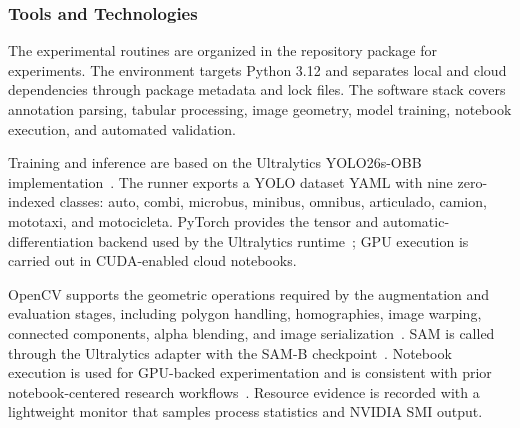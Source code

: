 \subsubsection{Tools and Technologies}
\label{sec:tools_technologies}

The experimental routines are organized in the repository package for experiments. The environment targets Python 3.12 and separates local and cloud dependencies through package metadata and lock files. The software stack covers annotation parsing, tabular processing, image geometry, model training, notebook execution, and automated validation.

Training and inference are based on the Ultralytics YOLO26s-OBB implementation~\cite{Jocher2026}. The runner exports a YOLO dataset YAML with nine zero-indexed classes: auto, combi, microbus, minibus, omnibus, articulado, camion, mototaxi, and motocicleta. PyTorch provides the tensor and automatic-differentiation backend used by the Ultralytics runtime~\cite{Paszke2019PyTorch}; GPU execution is carried out in CUDA-enabled cloud notebooks.

OpenCV supports the geometric operations required by the augmentation and evaluation stages, including polygon handling, homographies, image warping, connected components, alpha blending, and image serialization~\cite{Bradski2000OpenCV}. SAM is called through the Ultralytics adapter with the SAM-B checkpoint~\cite{Kirillov2023SAM}. Notebook execution is used for GPU-backed experimentation and is consistent with prior notebook-centered research workflows~\cite{Garavagno2022ColabNAS,Zhao2021NaaVRE}. Resource evidence is recorded with a lightweight monitor that samples process statistics and NVIDIA SMI output.
